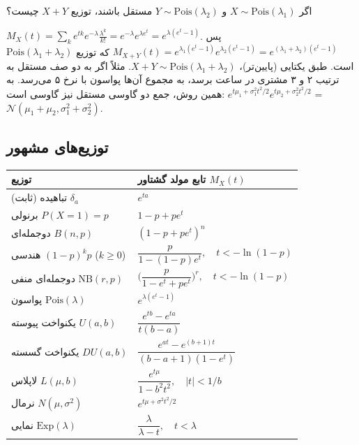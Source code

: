 \begin{example}
اگر $X\sim\mathrm{Pois}(\lambda_1)$ و $Y\sim\mathrm{Pois}(\lambda_2)$ مستقل باشند، توزیع $X+Y$ چیست؟
\begin{solution}
$M_X(t)=\sum_ke^{tk}e^{-\lambda}\frac{\lambda^k}{k!}=e^{-\lambda}e^{\lambda e^t}=e^{\lambda(e^t-1)}$. پس
$M_{X+Y}(t)=e^{\lambda_1(e^t-1)}e^{\lambda_2(e^t-1)}=e^{(\lambda_1+\lambda_2)(e^t-1)}$ که  توزیع $\mathrm{Pois}(\lambda_1+\lambda_2)$ است. طبق یکتایی (پایین‌تر)، $X+Y\sim\mathrm{Pois}(\lambda_1+\lambda_2)$. مثلاً اگر به دو صف مستقل به ترتیب ۲ و ۳ مشتری در ساعت برسد، به مجموع آن‌ها پواسون با نرخ ۵ می‌رسد. به همین روش، جمع دو گاوسی مستقل نیز گاوسی است: $e^{t\mu_1+\sigma_1^2t^2/2}e^{t\mu_2+\sigma_2^2t^2/2}$ =  $\mathcal N(\mu_1+\mu_2,\sigma_1^2+\sigma_2^2)$.
\end{solution}
\end{example}

\subsection{ توزیع‌های مشهور}
\begin{center}
\renewcommand{\arraystretch}{1.6}
\begin{tabular}{l|l}
\textbf{توزیع} & \textbf{تابع مولد گشتاور} $M_X(t)$\\\hline
تباهیده (ثابت) $\delta_a$ & $e^{ta}$\\
برنولی $P(X=1)=p$ & $1-p+pe^t$\\
دوجمله‌ای $B(n,p)$ & $(1-p+pe^t)^n$\\
هندسی $(1-p)^kp$ ($k\ge0$) & $\dfrac{p}{1-(1-p)e^t},\quad t<-\ln(1-p)$\\
دوجمله‌ای منفی $\mathrm{NB}(r,p)$ & $\Big(\dfrac{p}{1-e^t+pe^t}\Big)^r,\quad t<-\ln(1-p)$\\
پواسون $\mathrm{Pois}(\lambda)$ & $e^{\lambda(e^t-1)}$\\
یکنواخت پیوسته $U(a,b)$ & $\dfrac{e^{tb}-e^{ta}}{t(b-a)}$\\
یکنواخت گسسته $DU(a,b)$ & $\dfrac{e^{at}-e^{(b+1)t}}{(b-a+1)(1-e^t)}$\\
لاپلاس $L(\mu,b)$ & $\dfrac{e^{t\mu}}{1-b^2t^2},\quad |t|<1/b$\\
نرمال $N(\mu,\sigma^2)$ & $e^{t\mu+\sigma^2t^2/2}$\\
نمایی $\mathrm{Exp}(\lambda)$ & $\dfrac{\lambda}{\lambda-t},\quad t<\lambda$
\end{tabular}
\end{center}

